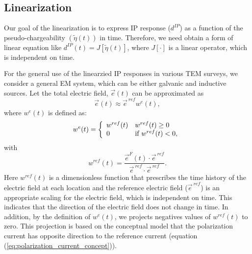 \documentclass[a4paper, 11pt]{article}
\newcommand {\e}  { {\vec e} }
\newcommand{\peta}{\tilde{\eta}}
\newcommand{\eref}{\e^{\ ref}}
\newcommand{\dip}{d^{IP}}
\begin{document}

\subsection{Linearization}
Our goal of the linearization is to express IP response ($\dip$) as a function of the pseudo-chargeability $(\peta(t))$ in time. 
Therefore, we need obtain a form of linear equation like $\dip(t) = J[\peta(t)]$, where $J[\cdot]$ is a linear operator, which is independent on time. 

For the general use of the linearzied IP responses in various TEM surveys, we consider a general EM system, which can be either galvanic and inductive sources. 
Let the total electric field, $\e(t)$ can be approximated as
\begin{equation}
  \e(t) \approx \eref w^e(t),
  \label{eq: e_with_eref}
\end{equation}
where $w^e(t)$ is defined as:
\begin{equation}
  w^e(t) = \left\{ 
  \begin{array}{l l}
    w^{ref}(t) & w^{ref}(t) \ge 0 \\
    0 & \text{if } w^{ref}(t) < 0, 
  \end{array}\right.
  \label{eq: we}
\end{equation}
with
\begin{equation}
  w^{ref}(t) = \frac{\e^F(t)\cdot\eref}{\eref\cdot\eref}.
\end{equation}
Here $w^{ref}(t)$ is a dimensionless function that prescribes the time history of the electric field at each location and the reference electric field ($\eref$) is an appropriate scaling for the electric field, which is independent on time. 
This indicates that the direction of the electric field does not change in time. 
In addition, by the definition of $w^e(t)$, we projects negatives values of  $w^{ref}(t)$ to zero.
This projection is based on the conceptual model that the polarization current has opposite direction to the reference current (equation (\ref{eq:polarization_current_concept})). 
\end{document}
